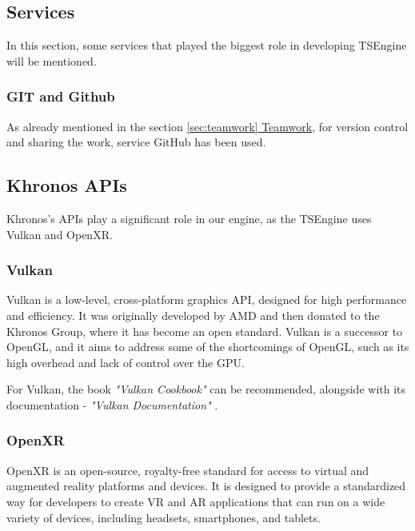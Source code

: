 \subsection{Services}
\hspace{\parindent}
In this section, some services that played the biggest role in developing TSEngine will be mentioned.
\subsubsection{GIT and Github}
\hspace{\parindent}
As already mentioned in the section \hyperref[sec:teamwork]{\ref*{sec:teamwork} Teamwork}, for version control and sharing the work, service GitHub has been used. 

\subsection{Khronos APIs}
\hspace{\parindent}
\label{sec:khronos}
Khronos's APIs play a significant role in our engine, as the TSEngine uses Vulkan and OpenXR. 

\subsubsection{Vulkan}
\label{sec:stack_vk}
\hspace{\parindent}
Vulkan is a low-level, cross-platform graphics API, designed for high performance and efficiency. It was originally developed by AMD and then donated to the Khronos Group, where it has become an open standard. Vulkan is a successor to OpenGL, and it aims to address some of the shortcomings of OpenGL, such as its high overhead and lack of control over the GPU.

For Vulkan, the book \textit{"Vulkan Cookbook"} can be recommended\cite{VulkanCookbook}, alongside with its documentation - \textit{"Vulkan Documentation"} \cite{VkDoc}.

\subsubsection{OpenXR}
\label{sec:stack_xr}
\hspace{\parindent}
OpenXR is an open-source, royalty-free standard for access to virtual and augmented reality platforms and devices. It is designed to provide a standardized way for developers to create VR and AR applications that can run on a wide variety of devices, including headsets, smartphones, and tablets.

